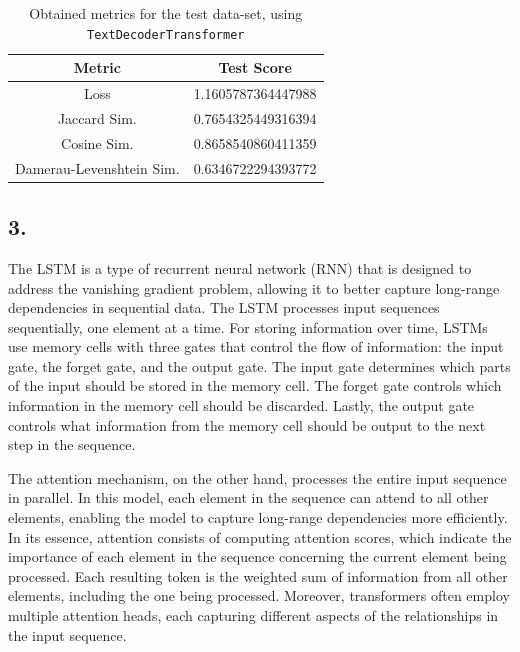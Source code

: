 \documentclass[11pt]{article}
\begin{document}
\begin{table}[H]
    \centering
    \begin{tabular}{cc}
        \toprule
        \textbf{Metric}          & \textbf{Test Score} \\
        \midrule
        Loss                     & 1.1605787364447988  \\
        Jaccard Sim.             & 0.7654325449316394  \\
        Cosine Sim.              & 0.8658540860411359  \\
        Damerau-Levenshtein Sim. & 0.6346722294393772  \\
        \bottomrule
    \end{tabular}
    \caption{Obtained metrics for the test data-set, using \texttt{TextDecoderTransformer}}
\end{table}

\subsection*{3.}

The LSTM is a type of recurrent neural network (RNN) that is designed to address the vanishing gradient problem, allowing it to better capture long-range dependencies in sequential data. The LSTM processes input sequences sequentially, one element at a time. For storing information over time, LSTMs use memory cells with three gates that control the flow of information: the input gate, the forget gate, and the output gate. The input gate determines which parts of the input should be stored in the memory cell. The forget gate controls which information in the memory cell should be discarded. Lastly, the output gate controls what information from the memory cell should be output to the next step in the sequence.

The attention mechanism, on the other hand, processes the entire input sequence in parallel. In this model, each element in the sequence can attend to all other elements, enabling the model to capture long-range dependencies more efficiently. In its essence, attention consists of computing attention scores, which indicate the importance of each element in the sequence concerning the current element being processed. Each resulting token is the weighted sum of information from all other elements, including the one being processed. Moreover, transformers often employ multiple attention heads, each capturing different aspects of the relationships in the input sequence.
\end{document}
